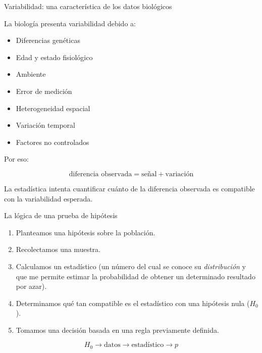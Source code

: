 \documentclass[11pt, aspectratio=169]{beamer}
\begin{document}
\begin{frame}{Variabilidad: una característica de los datos biológicos}

La biología presenta variabilidad debido a:

\begin{itemize}[<+->]
    \item Diferencias genéticas
    \item Edad y estado fisiológico
    \item Ambiente
    \item Error de medición
    \item Heterogeneidad espacial
    \item Variación temporal
    \item Factores no controlados
\end{itemize}

\vspace{0.3cm}

Por eso:

\vspace{-.5em}

\[
\text{diferencia observada}
=
\text{señal}
+
\text{variación}
\]

\pause

La estadística intenta cuantificar cuánto de la diferencia observada
es compatible con la variabilidad esperada.

\end{frame}

\begin{frame}{La lógica de una prueba de hipótesis}

\begin{enumerate}[<+->]
    \item Planteamos una hipótesis sobre la población.
    \item Recolectamos una muestra.
    \item Calculamos un estadístico (un número del cual se conoce su
    \emph{distribución} y que me permite estimar la probabilidad de obtener
    un determinado resultado por azar).
    \item Determinamos qué tan compatible es el estadístico con una
    hipótesis nula ($H_0$).
    \item Tomamos una decisión basada en una regla previamente definida.
\end{enumerate}

\vspace{0.4cm}

\begin{center}
\Large
\[
\boxed{
H_0
\longrightarrow
\text{datos}
\longrightarrow
\text{estadístico}
\longrightarrow
p
}
\]
\end{center}

\end{frame}
\end{document}
